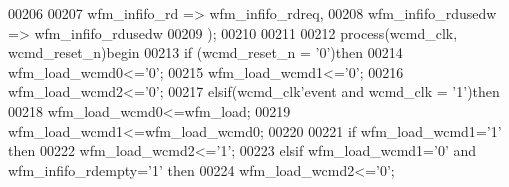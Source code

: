 \begin{DoxyCode}
00206 
00207         wfm_infifo_rd           => wfm_infifo_rdreq, 
00208         wfm_infifo_rdusedw  => wfm_infifo_rdusedw     
00209         \textcolor{vhdlchar}{)};
00210 
00211 
00212 \textcolor{keywordflow}{process}(wcmd_clk, wcmd_reset_n)\textcolor{keywordflow}{begin}
00213     \textcolor{keywordflow}{if} \textcolor{vhdlchar}{(}\textcolor{vhdlchar}{wcmd_reset_n} \textcolor{vhdlchar}{=} \textcolor{vhdlchar}{'}\textcolor{vhdllogic}{}\textcolor{vhdllogic}{0}\textcolor{vhdlchar}{'}\textcolor{vhdlchar}{)}\textcolor{keywordflow}{then}
00214         \textcolor{vhdlchar}{wfm_load_wcmd0}\textcolor{vhdlchar}{<=}\textcolor{vhdlchar}{'}\textcolor{vhdllogic}{}\textcolor{vhdllogic}{0}\textcolor{vhdlchar}{'};
00215         \textcolor{vhdlchar}{wfm_load_wcmd1}\textcolor{vhdlchar}{<=}\textcolor{vhdlchar}{'}\textcolor{vhdllogic}{}\textcolor{vhdllogic}{0}\textcolor{vhdlchar}{'};
00216         \textcolor{vhdlchar}{wfm_load_wcmd2}\textcolor{vhdlchar}{<=}\textcolor{vhdlchar}{'}\textcolor{vhdllogic}{}\textcolor{vhdllogic}{0}\textcolor{vhdlchar}{'};
00217     \textcolor{keywordflow}{elsif}\textcolor{vhdlchar}{(}\textcolor{vhdlchar}{wcmd_clk}\textcolor{vhdlchar}{'}\textcolor{vhdlkeyword}{event} \textcolor{keywordflow}{and} \textcolor{vhdlchar}{wcmd_clk} \textcolor{vhdlchar}{=} \textcolor{vhdlchar}{'}\textcolor{vhdllogic}{}\textcolor{vhdllogic}{1}\textcolor{vhdlchar}{'}\textcolor{vhdlchar}{)}\textcolor{keywordflow}{then} 
00218         \textcolor{vhdlchar}{wfm_load_wcmd0}\textcolor{vhdlchar}{<=}\textcolor{vhdlchar}{wfm_load};
00219         \textcolor{vhdlchar}{wfm_load_wcmd1}\textcolor{vhdlchar}{<=}\textcolor{vhdlchar}{wfm_load_wcmd0};
00220 
00221         \textcolor{keywordflow}{if} \textcolor{vhdlchar}{wfm_load_wcmd1}\textcolor{vhdlchar}{=}\textcolor{vhdlchar}{'}\textcolor{vhdllogic}{}\textcolor{vhdllogic}{1}\textcolor{vhdlchar}{'} \textcolor{keywordflow}{then} 
00222             \textcolor{vhdlchar}{wfm_load_wcmd2}\textcolor{vhdlchar}{<=}\textcolor{vhdlchar}{'}\textcolor{vhdllogic}{}\textcolor{vhdllogic}{1}\textcolor{vhdlchar}{'};
00223         \textcolor{keywordflow}{elsif} \textcolor{vhdlchar}{wfm_load_wcmd1}\textcolor{vhdlchar}{=}\textcolor{vhdlchar}{'}\textcolor{vhdllogic}{}\textcolor{vhdllogic}{0}\textcolor{vhdlchar}{'} \textcolor{keywordflow}{and} \textcolor{vhdlchar}{wfm_infifo_rdempty}\textcolor{vhdlchar}{=}\textcolor{vhdlchar}{'}\textcolor{vhdllogic}{}\textcolor{vhdllogic}{1}\textcolor{vhdlchar}{'} \textcolor{keywordflow}{then}
00224             \textcolor{vhdlchar}{wfm_load_wcmd2}\textcolor{vhdlchar}{<=}\textcolor{vhdlchar}{'}\textcolor{vhdllogic}{}\textcolor{vhdllogic}{0}\textcolor{vhdlchar}{'};

\end{DoxyCode}
